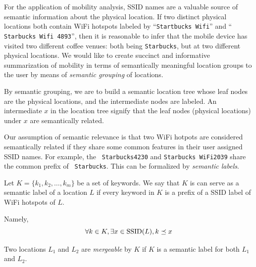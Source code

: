 For the application of mobility analysis, SSID names are a valuable source of
semantic information about the physical location.  If two distinct physical
locations
both contain WiFi hotspots labeled by ``{\tt Startbucks Wifi}'' and ``{\tt
Starbucks Wifi 4893}'', then it is reasonable to infer that the mobile device
has visited two different coffee venues: both being {\tt Starbucks}, but at two
different physical locations.  
We would like to create succinct and informative
summarization of mobility in terms of semantically meaningful location groups to
the user by means of {\em semantic grouping} of locations.

By semantic grouping, we are to build a semantic location tree whose leaf nodes are the physical
locations, and the intermediate nodes are labeled.  An intermediate $x$ in the
location tree signify that the leaf nodes (physical locations) under $x$ are
semantically related.

Our assumption of semantic relevance is that
two WiFi hotpots are considered semantically related if they share some common
features in their user assigned SSID names.  For example, the {\tt
Starbucks4230} and {\tt Starbucks WiFi2039} share the common prefix of {\tt
Starbucks}.  This can be formalized by {\em semantic labels}.

\begin{definition}
    Let $K = \{k_1, k_2, \dots, k_m\}$ be a set of keywords.
    We say that $K$ is can serve as a semantic label of a location $L$ if every
    keyword in $K$ is a prefix of a SSID label of WiFi hotspots of $L$.

    Namely,
    $$ \forall k\in K, \exists x\in\mathrm{SSID}(L), k\preceq x$$

    Two locations $L_1$ and $L_2$ are {\em mergeable} by $K$ if $K$ is a semantic
    label for both $L_1$ and $L_2$.
\end{definition}


